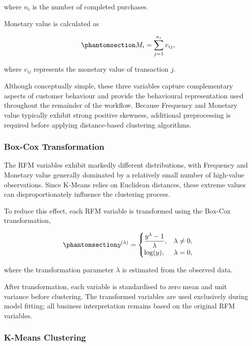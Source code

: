 \documentclass[
  12pt,
  letterpaper,
]{book}
\begin{document}
where \(n_i\) is the number of completed purchases.

Monetary value is calculated as

\begin{equation}\phantomsection\label{eq-rfm-monetary}{
M_i=\sum_{j=1}^{n_i}v_{ij},
}\end{equation}

where \(v_{ij}\) represents the monetary value of transaction \(j\).

Although conceptually simple, these three variables capture
complementary aspects of customer behaviour and provide the behavioural
representation used throughout the remainder of the workflow. Because
Frequency and Monetary value typically exhibit strong positive skewness,
additional preprocessing is required before applying distance-based
clustering algorithms.

\subsubsection{Box-Cox Transformation}\label{box-cox-transformation}

The RFM variables exhibit markedly different distributions, with
Frequency and Monetary value generally dominated by a relatively small
number of high-value observations. Since K-Means relies on Euclidean
distances, these extreme values can disproportionately influence the
clustering process.

To reduce this effect, each RFM variable is transformed using the
Box-Cox transformation,

\begin{equation}\phantomsection\label{eq-boxcox}{
y^{(\lambda)}=
\begin{cases}
\dfrac{y^\lambda-1}{\lambda}, & \lambda \neq 0,\\
\log(y), & \lambda=0,
\end{cases}
}\end{equation}

where the transformation parameter \(\lambda\) is estimated from the
observed data.

After transformation, each variable is standardised to zero mean and
unit variance before clustering. The transformed variables are used
exclusively during model fitting; all business interpretation remains
based on the original RFM variables.

\subsubsection{K-Means Clustering}\label{k-means-clustering}
\end{document}
